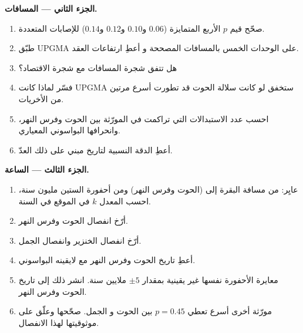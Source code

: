 \begin{problem}
\medskip
\noindent\textbf{الجزء الثاني --- المسافات.}
\begin{enumerate}[resume]
  \item صحّح قيم $p$ الأربع المتمايزة ($0.06$ و$0.10$ و$0.12$
        و$0.14$) للإصابات المتعددة.
  \item طبّق UPGMA على الوحدات الخمس بالمسافات المصححة و
        أعطِ ارتفاعات العقد.
  \item هل تتفق شجرة المسافات مع شجرة الاقتصاد؟
  \item فسّر لماذا كانت UPGMA ستخفق لو كانت سلالة الحوت قد
        تطورت أسرع مرتين من الأخريات.
  \item احسب عدد الاستبدالات التي تراكمت في المورّثة
        بين الحوت وفرس النهر، وانحرافها البواسوني
        المعياري.
  \item أعطِ الدقة النسبية لتاريخ مبني على ذلك العدّ.
\end{enumerate}

\medskip
\noindent\textbf{الجزء الثالث --- الساعة.}
\begin{enumerate}[resume]
  \item عايِر: من مسافة البقرة إلى (الحوت وفرس النهر) ومن
        أحفورة الستين مليون سنة، احسب المعدل $k$ في الموقع في
        السنة.
  \item أرّخ انفصال الحوت وفرس النهر.
  \item أرّخ انفصال الخنزير وانفصال الجمل.
  \item أعطِ تاريخ الحوت وفرس النهر مع لايقينه البواسوني.
  \item معايرة الأحفورة نفسها غير يقينية بمقدار $\pm 5$
        ملايين سنة. انشر ذلك إلى تاريخ الحوت وفرس النهر.
  \item مورّثة أخرى أسرع تعطي $p = 0.45$ بين الحوت و
        الجمل. صحّحها وعلّق على موثوقيتها لهذا الانفصال.
\end{enumerate}


\end{problem}
